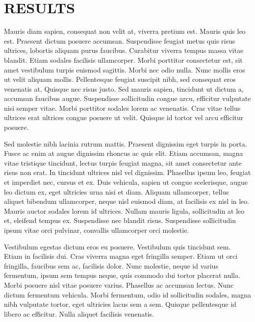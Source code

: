 \renewcommand{\chaptername}{}

\chapter{RESULTS}
 
Mauris diam sapien, consequat non velit at, viverra pretium est. Mauris quis leo est. Praesent dictum posuere accumsan. Suspendisse feugiat metus quis risus ultrices, lobortis aliquam purus faucibus. Curabitur viverra tempus massa vitae blandit. Etiam sodales facilisis ullamcorper. Morbi porttitor consectetur est, sit amet vestibulum turpis euismod sagittis. Morbi nec odio nulla. Nunc mollis eros ut velit aliquam mollis. Pellentesque feugiat suscipit nibh, sed consequat eros venenatis at. Quisque nec risus justo. Sed mauris sapien, tincidunt ut dictum a, accumsan faucibus augue. Suspendisse sollicitudin congue arcu, efficitur vulputate nisi semper vitae. Morbi porttitor sodales lorem ac venenatis. Cras vitae tellus ultrices erat ultrices congue posuere ut velit. Quisque id tortor vel arcu efficitur posuere.

Sed molestie nibh lacinia rutrum mattis. Praesent dignissim eget turpis in porta. Fusce ac enim at augue dignissim rhoncus ac quis elit. Etiam accumsan, magna vitae tristique tincidunt, lectus turpis feugiat magna, sit amet consectetur ante risus non erat. In tincidunt ultrices nisl vel dignissim. Phasellus ipsum leo, feugiat et imperdiet nec, cursus et ex. Duis vehicula, sapien ut congue scelerisque, augue leo dictum ex, eget ultricies urna nisi et diam. Aliquam ullamcorper, tellus aliquet bibendum ullamcorper, neque nisl euismod diam, at facilisis ex nisl in leo. Mauris auctor sodales lorem id ultrices. Nullam mauris ligula, sollicitudin at leo et, eleifend tempus ex. Suspendisse nec blandit risus. Suspendisse sollicitudin ipsum vitae orci pulvinar, convallis ullamcorper orci molestie.

Vestibulum egestas dictum eros eu posuere. Vestibulum quis tincidunt sem. Etiam in facilisis dui. Cras viverra magna eget fringilla semper. Etiam ut orci fringilla, faucibus sem ac, facilisis dolor. Nunc molestie, neque id varius fermentum, ipsum sem tempus neque, quis commodo dui tortor placerat nulla. Morbi posuere nisl vitae posuere varius. Phasellus ac accumsan lectus. Nunc dictum fermentum vehicula. Morbi fermentum, odio id sollicitudin sodales, magna nibh vulputate tortor, eget ultricies lacus sem a sem. Quisque pellentesque id libero ac efficitur. Nulla aliquet facilisis venenatis.

